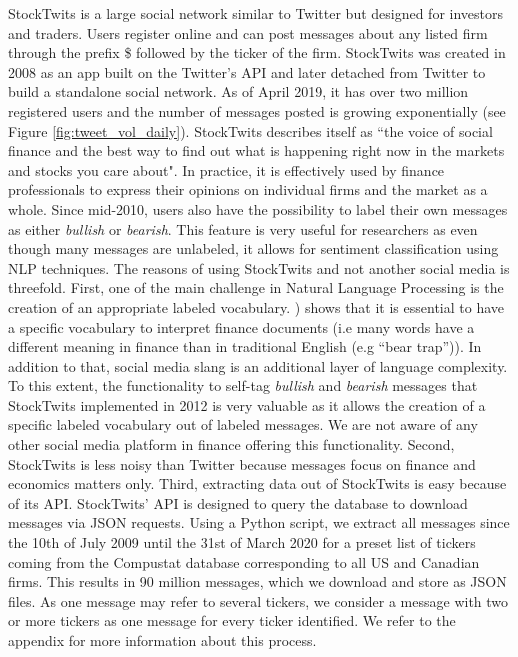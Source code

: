 StockTwits is a large social network similar to Twitter but designed for investors and traders. Users register online and can post messages about any listed firm through the prefix \$ followed by the ticker of the firm. StockTwits was created in 2008 as an app built on the Twitter's API and later detached from Twitter to build a standalone social network. As of April 2019, it has over two million registered users and the number of messages posted is growing exponentially (see Figure \ref{fig:tweet_vol_daily}). StockTwits describes itself as ``the voice of social finance and the best way to find out what is happening right now in the markets and stocks you care about". In practice, it is effectively used by finance professionals to express their opinions on individual firms and the market as a whole. Since mid-2010, users also have the possibility to label their own messages as either \textit{bullish} or \textit{bearish}. This feature is very useful for researchers as even though many messages are unlabeled, it allows for sentiment classification using NLP techniques. The reasons of using StockTwits and not another social media is threefold. First, one of the main challenge in Natural Language Processing is the creation of an appropriate labeled vocabulary. \citet{loughran2011barron}) shows that it is essential to have a specific vocabulary to interpret finance documents (i.e many words have a different meaning in finance than in traditional English (e.g “bear trap”)). In addition to that, social media slang is an additional layer of language complexity. To this extent, the functionality to self-tag \textit{bullish} and \textit{bearish} messages that StockTwits implemented in 2012 is very valuable as it allows the creation of a specific labeled vocabulary out of labeled messages. We are not aware of any other social media platform in finance offering this functionality. Second, StockTwits is less noisy than Twitter because messages focus on finance and economics matters only. Third, extracting data out of StockTwits is easy because of its API. StockTwits' API is designed to query the database to download messages via JSON requests. Using a Python script, we extract all messages since the 10th of July 2009 until the 31st of March 2020 for a preset list of tickers coming from the Compustat database corresponding to all US and Canadian firms. This results in 90 million messages, which we download and store as JSON files. As one message may refer to several tickers, we consider a message with two or more tickers as one message for every ticker identified. We refer to the appendix for more information about this process.
 
